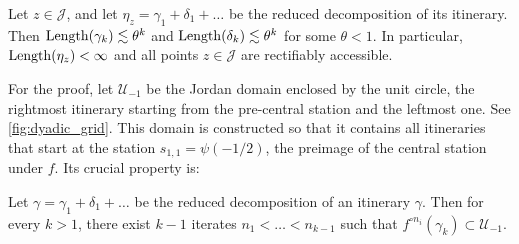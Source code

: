 \begin{proposition} \label{prop:finite-length}
	Let $z \in \mathcal J$, and let $\eta_z= \gamma_1 + \delta_1 + \dots  $ be the reduced decomposition of its itinerary. Then $\operatorname{Length}(\gamma_k)\lesssim \theta^k$ and $\operatorname{Length}(\delta_k)\lesssim \theta^k$ for some $\theta < 1$. In particular, $\operatorname{Length}(\eta_z)<\infty$ and all points $z\mathcal \in \mathcal J$ are rectifiably accessible.
\end{proposition}

For the proof, let $\mathcal U_{-1}$ be the Jordan domain enclosed by the unit circle, 
the rightmost itinerary starting from the pre-central station and the leftmost one. 
See \cref{fig:dyadic_grid}.
This domain is constructed so that it contains all itineraries that start at the station 
$s_{1,1} = \psi(-1/2)$, the preimage of the central station under $f$. Its crucial property is: 

\begin{lemma} \label{lemma-enough-visits-of-premain_station}
	Let $\gamma = \gamma_1 + \delta_1 + \dots $ be the reduced decomposition of an itinerary $\gamma$. Then for every $k > 1$, there exist $k-1$ iterates $n_1 < \dots < n_{k-1}$ such that $f^{\circ {n_i}}(\gamma_k) \subset \mathcal U_{-1}$. %
\end{lemma}


